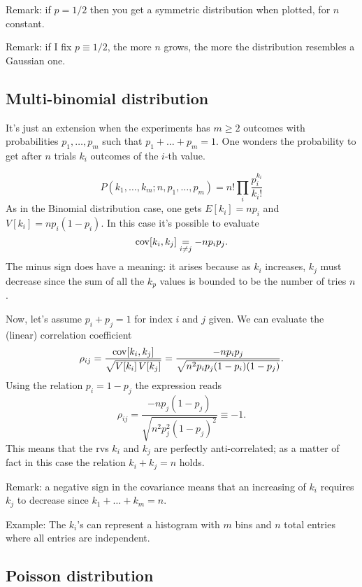 Remark: if $p=1/2$ then you get a symmetric distribution when plotted, for $n$ constant.


Remark: if I fix $p \equiv 1/2$, the more $n$ grows, the more the distribution resembles a Gaussian one.

\subsection{Multi-binomial distribution}

It's just an extension when the experiments has $m\ge2$ outcomes with probabilities ${p_1,\dots,p_m}$ such that $p_1 + \dots + p_m = 1$.
One wonders the probability to get after $n$ trials $k_i$ outcomes of the $i$-th value.

\begin{equation}
	P(k_1,\dots,k_m; n, p_1,\dots,p_m) = n! \prod_i\frac{p_i^{k_i}}{k_i!}
\end{equation}
As in the Binomial distribution case, one gets $E[k_i] = np_i$ and $V[k_i] = np_i(1-p_i)$.
In this case it's possible to evaluate
\begin{equation}
	\operatorname{cov}[k_i,k_j] \underset{i\neq j}{=} - n p_ip_j.
\end{equation}
The minus sign does have a meaning: it arises because as $k_i$ increases, $k_j$ must decrease since the sum of all the $k_p$ values is bounded to be the number of tries $n$.


Now, let's assume $p_i + p_j = 1$ for index $i$ and $j$ given.
We can evaluate the (linear) correlation  coefficient
\begin{equation}
	\rho_{ij} = \frac{\operatorname{cov}[k_i,k_j]}{\sqrt{V[k_i]\,V[k_j]}} =
	\frac{-n p_ip_j}{\sqrt{n^2p_ip_j(1-p_i)(1-p_j)}}.
\end{equation}
Using the relation $p_i = 1-p_j$ the expression reads
\begin{equation}
	\rho_{ij} = \frac{-n p_j(1-p_j)}{\sqrt{n^2 p_j^2(1-p_j)^2} }\equiv -1.
\end{equation}
This means that the \acp{rv} $k_i$ and $k_j$ are perfectly anti-correlated; as a matter of fact in this case the relation $k_i + k_j = n$ holds.

Remark: a negative sign in the covariance means that an increasing of $k_i$ requires $k_j$ to decrease since $k_1+\dots+k_m= n$.

Example: The $k_i$'s can represent a histogram with $m$ bins and $n$ total entries where all entries are independent.


\subsection{Poisson distribution}

